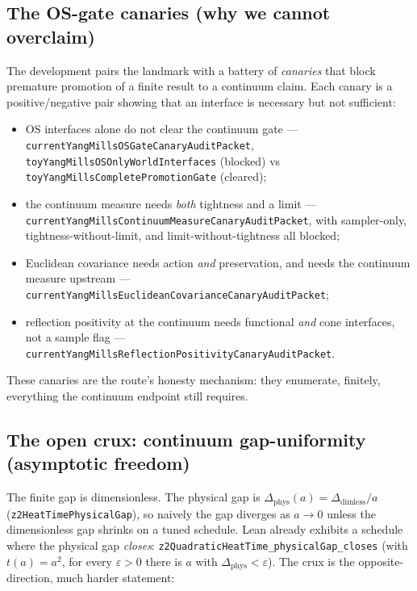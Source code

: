 \subsection{The OS-gate canaries (why we cannot overclaim)}

The development pairs the landmark with a battery of \emph{canaries} that block
premature promotion of a finite result to a continuum claim. Each canary is a
positive/negative pair showing that an interface is necessary but not
sufficient:
\begin{itemize}\itemsep1pt
  \item OS interfaces alone do not clear the continuum gate ---
    \verb|currentYangMillsOSGateCanaryAuditPacket|,
    \verb|toyYangMillsOSOnlyWorldInterfaces| (blocked) vs
    \verb|toyYangMillsCompletePromotionGate| (cleared);
  \item the continuum measure needs \emph{both} tightness and a limit ---
    \verb|currentYangMillsContinuumMeasureCanaryAuditPacket|, with sampler-only,
    tightness-without-limit, and limit-without-tightness all blocked;
  \item Euclidean covariance needs action \emph{and} preservation, and needs the
    continuum measure upstream ---
    \verb|currentYangMillsEuclideanCovarianceCanaryAuditPacket|;
  \item reflection positivity at the continuum needs functional \emph{and} cone
    interfaces, not a sample flag ---
    \verb|currentYangMillsReflectionPositivityCanaryAuditPacket|.
\end{itemize}
These canaries are the route's honesty mechanism: they enumerate, finitely,
everything the continuum endpoint still requires.

\subsection{The open crux: continuum gap-uniformity (asymptotic freedom)}

The finite gap is dimensionless. The physical gap is
$\Delta_{\mathrm{phys}}(a)=\Delta_{\mathrm{dimless}}/a$
(\verb|z2HeatTimePhysicalGap|), so naively the gap diverges as $a\to0$ unless the
dimensionless gap shrinks on a tuned schedule. Lean already exhibits a schedule
where the physical gap \emph{closes}:
\verb|z2QuadraticHeatTime_physicalGap_closes| (with $t(a)=a^2$, for every
$\varepsilon>0$ there is $a$ with $\Delta_{\mathrm{phys}}<\varepsilon$). The
crux is the opposite-direction, much harder statement:

